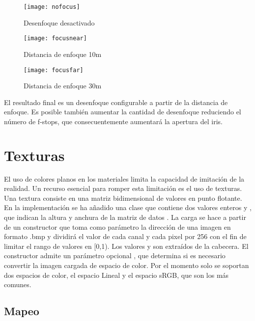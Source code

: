	\begin{figure}[H]
	\label{fig:focusboxes}
		\centering
	  \begin{minipage}[b]{0.3\textwidth}
		\texttt{[image: nofocus]}
		\caption{Desenfoque desactivado}
	  \end{minipage}
	  \hfill
	  \begin{minipage}[b]{0.3\textwidth}
		\texttt{[image: focusnear]}
		\caption{Distancia de enfoque 10m}
	  \end{minipage}
	  	\hfill
	  \begin{minipage}[b]{0.3\textwidth}
		\texttt{[image: focusfar]}
		\caption{Distancia de enfoque 30m}
	  \end{minipage}
	\end{figure}
	
	
El resultado final es un desenfoque configurable a partir de la distancia de enfoque. Es posible también aumentar la cantidad de desenfoque reduciendo el número de f-stops, que consecuentemente aumentará la apertura del iris.

	
\section{Texturas}
	
El uso de colores planos en los materiales limita la capacidad de imitación de la realidad. Un recurso esencial para romper esta limitación es el uso de texturas. Una textura consiste en una matriz bidimensional de valores en punto flotante. En la implementación se ha añadido una clase  que contiene dos valores enteros  y , que indican la altura y anchura de la matriz de datos . La carga se hace a partir de un constructor que toma como parámetro la dirección de una imagen en formato .bmp y dividirá el valor de cada canal y cada pixel por 256 con el fin de limitar el rango de valores en [0,1). Los valores  y  son extraídos de la cabecera. El constructor admite un parámetro opcional , que determina si es necesario convertir la imagen cargada de espacio de color. Por el momento solo se soportan dos espacios de color, el espacio Lineal y el espacio sRGB, que son los más comunes.
	
	
\subsection{Mapeo}

